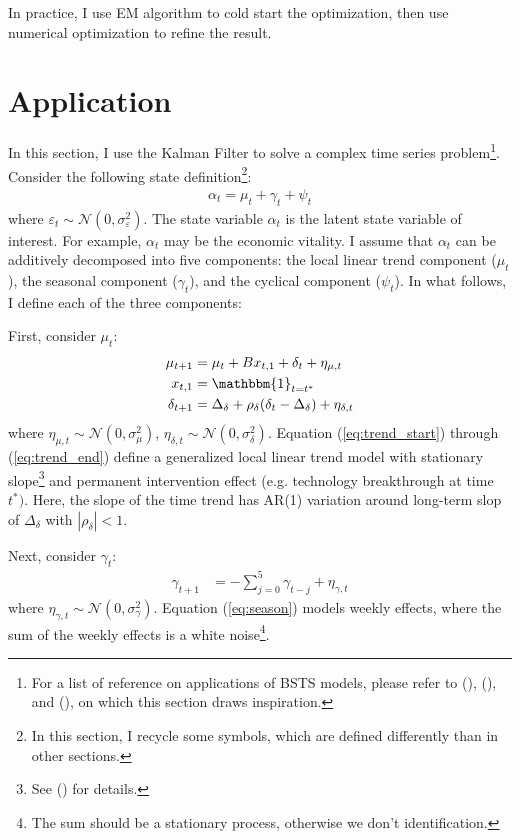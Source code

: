\documentclass[10pt]{article}
\numberwithin{equation}{section}
\begin{document}
In practice, I use EM algorithm to cold start the optimization, then use numerical optimization to refine the result.

\section{Application} \label{sec:apply}
In this section, I use the Kalman Filter to solve a complex time series problem\footnote{For a list of reference on applications of BSTS models, please refer to (\cite{brodersen_etal_2015}), (\cite{harvey_1985}), and (\cite{harvey2007trends}), on which this section draws inspiration.}. Consider the following state definition\footnote{In this section, I recycle some symbols, which are defined differently than in other sections.}:
\begin{align}
    \alpha_t = \mu_t + \gamma_t + \psi_t \label{eq:state_decompose}
\end{align}
where $\varepsilon_t\sim\mathcal{N}(0,\sigma_{\varepsilon}^2)$. The state variable $\alpha_t$ is the latent state variable of interest. For example, $\alpha_t$ may be the economic vitality. I assume that $\alpha_t$ can be additively decomposed into five components: the local linear trend component ($\mu_t$), the seasonal component ($\gamma_t$), and the cyclical component ($\psi_t$). In what follows, I define each of the three components:

First, consider $\mu_t$:
\begin{align}
    \mu_{t+1} &= \mu_t+Bx_{t,1}+\delta_t+\eta_{\mu,t} \label{eq:trend_start} \\
    x_{t,1} &= \mathbbm{1}_{t=t^{*}} \\
    \delta_{t+1} &= \Delta_{\delta} + \rho_{\delta}(\delta_t-\Delta_{\delta}) + \eta_{\delta,t} \label{eq:trend_end} 
\end{align}
where $\eta_{\mu,t}\sim\mathcal{N}(0,\sigma_{\mu}^2)$, $\eta_{\delta,t}\sim\mathcal{N}(0,\sigma_{\delta}^2)$. Equation (\ref{eq:trend_start}) through (\ref{eq:trend_end}) define a generalized local linear trend model with stationary slope\footnote{See (\cite{brodersen_etal_2015}) for details.} and permanent intervention effect (e.g. technology breakthrough at time $t^*)$. Here, the slope of the time trend has AR(1) variation around long-term slop of $\Delta_{\delta}$ with $|\rho_{\delta}|<1$. 

Next, consider $\gamma_t$:
\begin{align}
    \gamma_{t+1}&= -\sum_{j=0}^{5}\gamma_{t-j} + \eta_{\gamma,t} \label{eq:season}
\end{align}
where $\eta_{\gamma,t}\sim\mathcal{N}(0,\sigma_{\gamma}^2)$. Equation (\ref{eq:season}) models weekly effects, where the sum of the weekly effects is a white noise\footnote{The sum should be a stationary process, otherwise we don't identification.}.
\end{document}

